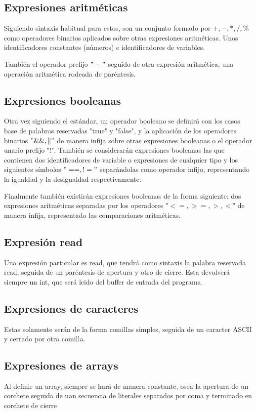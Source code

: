 \documentclass{article}
\begin{document}
\subsection{Expresiones aritméticas}

Siguiendo sintaxis habitual para estos, son un conjunto formado por $+,-,*,/, \%$ como operadores binarios aplicados sobre otras expresiones aritméticas. Unos identificadores constantes (números) e identificadores de variables.

También el operador prefijo $"-"$ seguido de otra expresión aritmética, una operación aritmética rodeada de paréntesis.

\subsection{Expresiones booleanas}
Otra vez siguiendo el estándar, un operador booleano se definirá con los casos base de palabras reservadas "true" y "false", y la aplicación de los operadores binarios $"\&\&, \|"$ de manera infija sobre otras expresiones booleanas o el operador unario prefijo "!".
También se considerarán expresiones booleanas las que contienen dos identificadores de variable o expresiones de cualquier tipo y los siguientes símbolos $"==, !="$ separándolas como operador infijo, representando la igualdad y la desigualdad respectivamente.

Finalmente también existirán expresiones booleanas de la forma siguiente: dos expresiones aritméticas separadas por los operadores "$<=, >=, >, <$" de manera infija, representado las comparaciones aritméticas.

\subsection{Expresión read}
Una expresión particular es read, que tendrá como sintaxis la palabra reservada read, seguida de un paréntesis de apertura y otro de cierre. Esta devolverá siempre un int, que será leido del buffer de entrada del programa.


\subsection{Expresiones de caracteres\footnotemark[1]}
Estas solamente serán de la forma comillas simples, seguida de un caracter ASCII y cerrado por otra comilla.

\subsection{Expresiones de arrays\footnotemark[1]}
Al definir un array, siempre se hará de manera constante, osea la apertura de un corchete seguida de uan secuencia de literales separados por coma y terminado en corchete de cierre
\end{document}
